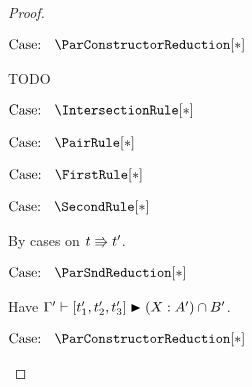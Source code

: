 \begin{proof}
\begin{proofcase}
\begin{proofcase}
        \end{proofcase}

        $\text{Case: }\begin{array}{c} \ParConstructorReduction[*] \end{array}$
        \begin{proofcase}
            TODO
        \end{proofcase}
    \end{proofcase}

    $\text{Case: }\begin{array}{c} \IntersectionRule[*] \end{array}$
    \begin{proofcase}
    \end{proofcase}

    $\text{Case: }\begin{array}{c} \PairRule[*] \end{array}$
    \begin{proofcase}
    \end{proofcase}

    $\text{Case: }\begin{array}{c} \FirstRule[*] \end{array}$
    \begin{proofcase}
    \end{proofcase}

    $\text{Case: }\begin{array}{c} \SecondRule[*] \end{array}$
    \begin{proofcase}
        By cases on $t \Rrightarrow t^\prime$.

        $\text{Case: }\begin{array}{c} \ParSndReduction[*] \end{array}$
        \begin{proofcase}
           Have $\Gamma^\prime \vdash [t_1^\prime, t_2^\prime, t_3^\prime] \blacktriangleright (X : A^\prime) \cap B^\prime$.
           

        \end{proofcase}

        $\text{Case: }\begin{array}{c} \ParConstructorReduction[*] \end{array}$
        \begin{proofcase}
        \end{proofcase}
    \end{proofcase}


\end{proof}
